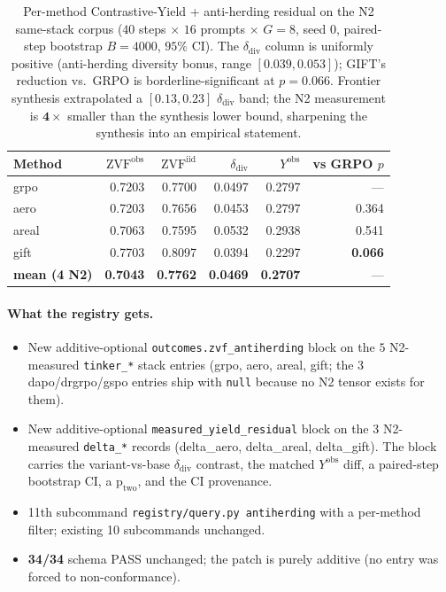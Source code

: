 \documentclass{article}
\begin{document}
\begin{table}[h]
\centering
\small
\begin{tabular}{lrrrrr}
\toprule
\textbf{Method} & $\mathrm{ZVF}^{\mathrm{obs}}$ & $\mathrm{ZVF}^{\mathrm{iid}}$ & $\delta_{\mathrm{div}}$ & $Y^{\mathrm{obs}}$ & vs GRPO $p$ \\
\midrule
grpo   & 0.7203 & 0.7700 & 0.0497 & 0.2797 & --- \\
aero   & 0.7203 & 0.7656 & 0.0453 & 0.2797 & 0.364 \\
areal  & 0.7063 & 0.7595 & 0.0532 & 0.2938 & 0.541 \\
gift   & 0.7703 & 0.8097 & 0.0394 & 0.2297 & \textbf{0.066} \\
\midrule
\textbf{mean (4 N2)} & \textbf{0.7043} & \textbf{0.7762} & \textbf{0.0469} & \textbf{0.2707} & --- \\
\bottomrule
\end{tabular}
\caption{Per-method Contrastive-Yield + anti-herding residual on the N2
same-stack corpus ($40$ steps $\times$ $16$ prompts $\times$ $G=8$,
seed $0$, paired-step bootstrap $B=4000$, $95\%$ CI). The $\delta_{\mathrm{div}}$
column is uniformly positive (anti-herding diversity bonus, range
$[0.039, 0.053]$); GIFT's reduction vs.\ GRPO is borderline-significant
at $p=0.066$. Frontier synthesis extrapolated a $[0.13, 0.23]$
$\delta_{\mathrm{div}}$ band; the N2 measurement is
$\mathbf{4\times}$ smaller than the synthesis lower bound, sharpening
the synthesis into an empirical statement.}
\label{tab:p6-zvf-antiherding}
\end{table}

\paragraph{What the registry gets.}
\begin{itemize}
  \item New additive-optional \texttt{outcomes.zvf\_antiherding} block on
        the $5$ N2-measured \texttt{tinker\_*} stack entries (grpo,
        aero, areal, gift; the 3 dapo/drgrpo/gspo entries ship with
        \texttt{null} because no N2 tensor exists for them).
  \item New additive-optional \texttt{measured\_yield\_residual} block
        on the 3 N2-measured \texttt{delta\_*} records (delta\_aero,
        delta\_areal, delta\_gift). The block carries the variant-vs-base
        $\delta_{\mathrm{div}}$ contrast, the matched $Y^{\mathrm{obs}}$
        diff, a paired-step bootstrap CI, a $\mathrm{p_{two}}$, and the
        CI provenance.
  \item 11th subcommand \texttt{registry/query.py antiherding} with
        a per-method filter; existing 10 subcommands unchanged.
  \item \textbf{34/34} schema PASS unchanged; the patch is purely
        additive (no entry was forced to non-conformance).
\end{itemize}
\end{document}
